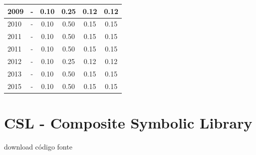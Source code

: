 \begin{table}[H]
\begin{tabular}{| l | c | c | c | c | c |}
\hline
            2009
          &
          -
          &
          0.10
          &
          0.25
          &
          0.12
          &
            {\color{red} 0.12}
          \\
\hline
            2010
          &
          -
          &
          0.10
          &
          0.50
          &
          0.15
          &
            {\color{red} 0.15}
          \\
\hline
            2011
          &
          -
          &
          0.10
          &
          0.50
          &
          0.15
          &
            {\color{red} 0.15}
          \\
            2011
          &
          -
          &
          0.10
          &
          0.50
          &
          0.15
          &
            {\color{red} 0.15}
          \\
\hline
            2012
          &
          -
          &
          0.10
          &
          0.25
          &
          0.12
          &
            {\color{red} 0.12}
          \\
\hline
            2013
          &
          -
          &
          0.10
          &
          0.50
          &
          0.15
          &
            {\color{red} 0.15}
          \\
\hline
            2015
          &
          -
          &
          0.10
          &
          0.50
          &
          0.15
          &
            {\color{red} 0.15}
          \\
\hline
\end{tabular}
\end{table}



\section{CSL - Composite Symbolic Library}
\checkmark download
\checkmark código fonte


